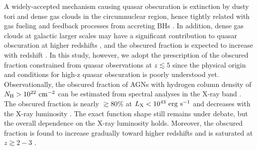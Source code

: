 \documentclass[twocolumn, twocolappendix]{aastex63}
\newcommand{\red}[1]{\textcolor{red}{ #1}}
\begin{document}
\begin{CJK*}{UTF8}{gbsn}
A widely-accepted mechanism causing quasar obscuration is extinction by dusty tori and dense gas clouds 
in the circumnuclear region, hence tightly related with gas fueling and feedback processes from accreting BHs 
\citep[see][for a review]{2018ARA&A..56..625H}.
In addition, dense gas clouds at galactic larger scales may have a significant contribution to quasar obscuration at 
higher redshifts \citep{2020MNRAS.495.2135N}, and the obscured fraction is expected to increase with redshift \citep[]{2022arXiv220603508G}. 
In this study, however, we adopt the prescription of the obscured fraction constrained from quasar observations at $z\lesssim 5$ 
since the physical origin and conditions for high-z quasar obscuration is poorly understood yet.
Observationally, the obscured fraction of AGNs with hydrogen column density of $N_{\rm H}>10^{22}~{\rm cm}^{-2}$
can be estimated from spectral analyses in the X-ray band
\citep[e.g.,][]{2003ApJ...598..886U,2007A&A...463...79G,2008A&A...490..905H}. 
The obscured fraction is nearly $\gtrsim 80\%$ at $L_{\rm X}<10^{43}~{\rm erg~s}^{-1}$ and 
decreases with the X-ray luminosity \citep{2014ApJ...786..104U,2014MNRAS.437.3550M}.
The exact function shape still remains under debate, but the overall dependence on the X-ray luminosity holds.
Moreover, the obscured fraction is found to increase gradually toward higher redshifts and is saturated at $z\gtrsim 2-3$
\citep{2008A&A...490..905H,2014ApJ...786..104U,2014MNRAS.437.3550M,2018MNRAS.473.2378V}.



\end{CJK*}
\end{document}
